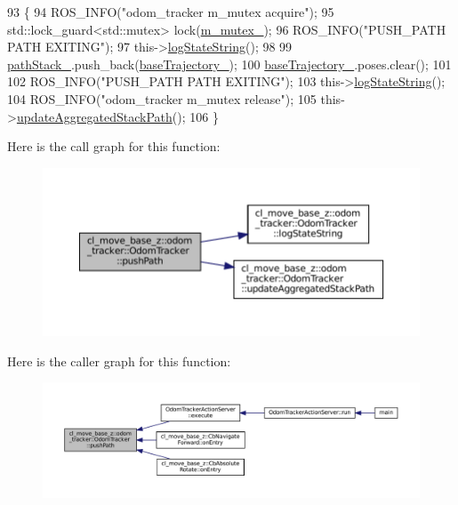 \begin{DoxyCode}
93 \{
94     ROS\_INFO(\textcolor{stringliteral}{"odom\_tracker m\_mutex acquire"});
95     std::lock\_guard<std::mutex> lock(\hyperlink{classcl__move__base__z_1_1odom__tracker_1_1OdomTracker_aa371639e1eee269273dec8d3ab9dba0f}{m\_mutex\_});
96     ROS\_INFO(\textcolor{stringliteral}{"PUSH\_PATH PATH EXITING"});
97     this->\hyperlink{classcl__move__base__z_1_1odom__tracker_1_1OdomTracker_a6d0b450474d9d555205ff4281965164e}{logStateString}();
98 
99     \hyperlink{classcl__move__base__z_1_1odom__tracker_1_1OdomTracker_a1ccad1b568b6c65da43ba6639b6bd1ef}{pathStack\_}.push\_back(\hyperlink{classcl__move__base__z_1_1odom__tracker_1_1OdomTracker_a466d18a86df049f0f680e043bb5ea91f}{baseTrajectory\_});
100     \hyperlink{classcl__move__base__z_1_1odom__tracker_1_1OdomTracker_a466d18a86df049f0f680e043bb5ea91f}{baseTrajectory\_}.poses.clear();
101 
102     ROS\_INFO(\textcolor{stringliteral}{"PUSH\_PATH PATH EXITING"});
103     this->\hyperlink{classcl__move__base__z_1_1odom__tracker_1_1OdomTracker_a6d0b450474d9d555205ff4281965164e}{logStateString}();
104     ROS\_INFO(\textcolor{stringliteral}{"odom\_tracker m\_mutex release"});
105     this->\hyperlink{classcl__move__base__z_1_1odom__tracker_1_1OdomTracker_a7922f1e1e688a2ed62d32d9914985a9f}{updateAggregatedStackPath}();
106 \}
\end{DoxyCode}
Here is the call graph for this function\+:
\nopagebreak
\begin{figure}[H]
\begin{center}
\leavevmode
\includegraphics[width=350pt]{classcl__move__base__z_1_1odom__tracker_1_1OdomTracker_a205ee48ec8b4599658e7408fc4755239_cgraph}
\end{center}
\end{figure}
Here is the caller graph for this function\+:
\nopagebreak
\begin{figure}[H]
\begin{center}
\leavevmode
\includegraphics[width=350pt]{classcl__move__base__z_1_1odom__tracker_1_1OdomTracker_a205ee48ec8b4599658e7408fc4755239_icgraph}
\end{center}
\end{figure}
